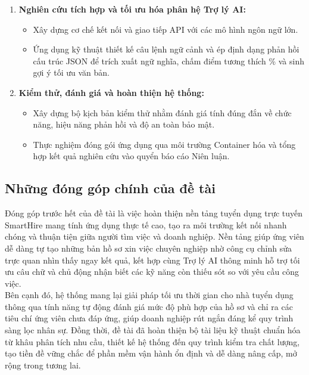 \begin{enumerate}
    \item \textbf{Nghiên cứu tích hợp và tối ưu hóa phân hệ Trợ lý AI:}
    \begin{itemize}
        \item Xây dựng cơ chế kết nối và giao tiếp API với các mô hình ngôn ngữ lớn.
        \item Ứng dụng kỹ thuật thiết kế câu lệnh ngữ cảnh và ép định dạng phản hồi cấu trúc JSON để trích xuất ngữ nghĩa, chấm điểm tương thích \% và sinh gợi ý tối ưu văn bản.
    \end{itemize}

    \item \textbf{Kiểm thử, đánh giá và hoàn thiện hệ thống:}
    \begin{itemize}
        \item Xây dựng bộ kịch bản kiểm thử nhằm đánh giá tính đúng đắn về chức năng, hiệu năng phản hồi và độ an toàn bảo mật.
        \item Thực nghiệm đóng gói ứng dụng qua môi trường Container hóa và tổng hợp kết quả nghiên cứu vào quyển báo cáo Niên luận.
    \end{itemize}
\end{enumerate}

\subsection{Những đóng góp chính của đề tài}
Đóng góp trước hết của đề tài là việc hoàn thiện nền tảng tuyển dụng trực tuyến SmartHire mang tính ứng dụng thực tế cao, tạo ra môi trường kết nối nhanh chóng và thuận tiện giữa người tìm việc và doanh nghiệp. Nền tảng giúp ứng viên dễ dàng tự tạo những bản hồ sơ xin việc chuyên nghiệp nhờ công cụ chỉnh sửa trực quan nhìn thấy ngay kết quả, kết hợp cùng Trợ lý AI thông minh hỗ trợ tối ưu câu chữ và chủ động nhận biết các kỹ năng còn thiếu sót so với yêu cầu công việc. \\
\indent Bên cạnh đó, hệ thống mang lại giải pháp tối ưu thời gian cho nhà tuyển dụng thông qua tính năng tự động đánh giá mức độ phù hợp của hồ sơ và chỉ ra các tiêu chí ứng viên chưa đáp ứng, giúp doanh nghiệp rút ngắn đáng kể quy trình sàng lọc nhân sự. Đồng thời, đề tài đã hoàn thiện bộ tài liệu kỹ thuật chuẩn hóa từ khâu phân tích nhu cầu, thiết kế hệ thống đến quy trình kiểm tra chất lượng, tạo tiền đề vững chắc để phần mềm vận hành ổn định và dễ dàng nâng cấp, mở rộng trong tương lai.


